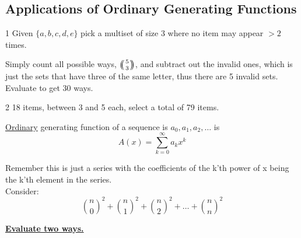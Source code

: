 \label{14-0305}



\subsection{Applications of Ordinary Generating Functions}

\begin{example} 1
    Given $\{a, b, c, d, e\}$ pick a multiset of size 3 where no 
item may appear $>2$ times.

\end{example}

\begin{solution}
    Simply count all possible ways, $\snb 5 3$, and subtract out 
    the invalid ones, which is just the sets that have three of the same letter,
    thus there are 5 invalid sets. Evaluate to get 30 ways.    
\end{solution}

\begin{example}2
    18 items, between 3 and 5 each, select a total of 79 items.
\end{example}

\begin{definition}
    \underline{Ordinary} generating function of a sequence is $a_{0}, a_{1}, a_{2}, \ldots$ 
    is \[A(x)=\sum_{k=0}^{\infty} a_{k} x^{k}
        \]
\end{definition}
  Remember this is just a series with the coefficients of the k'th power of x being the k'th element in the series.\\

  Consider:
\[
    \binom n 0^2 + \binom n 1^2 + \binom n 2^2 + \dots + \binom n n^2 
\]

 \underline{\textbf{Evaluate two ways.}}

